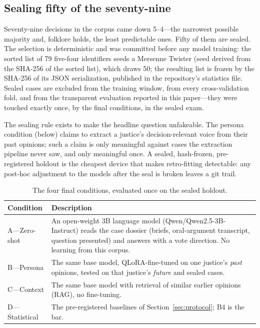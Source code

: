 \subsection{Sealing fifty of the seventy-nine}

Seventy-nine decisions in the corpus came down 5--4---the narrowest
possible majority and, folklore holds, the least predictable ones.
Fifty of them are sealed. The selection is deterministic and was
committed before any model training: the sorted list of 79 five-four
identifiers seeds a Mersenne Twister (seed derived from the SHA-256
of the sorted list), which draws 50; the resulting list is frozen by
the SHA-256 of its JSON serialization, published in the repository's
statistics file. Sealed cases are excluded from the training window,
from every cross-validation fold, and from the transparent evaluation
reported in this paper---they were touched exactly once, by the
final conditions, in the sealed exam.

The sealing rule exists to make the headline question unfakeable.
The persona condition (below) claims to extract a justice's
decision-relevant voice from their past opinions; such a claim is
only meaningful against cases the extraction pipeline never saw, and
only meaningful once. A sealed, hash-frozen, pre-registered holdout
is the cheapest device that makes retro-fitting detectable: any
post-hoc adjustment to the models after the seal is broken leaves a
git trail.

\begin{table}[t]
\centering
\caption{The four final conditions, evaluated once on the sealed
holdout.}
\label{tab:conditions}
\small
\begin{tabularx}{\linewidth}{@{}lX@{}}
\toprule
Condition & Description \\
\midrule
A---Zero-shot & An open-weight 3B language model
(Qwen/Qwen2.5-3B-Instruct) reads the case dossier (briefs,
oral-argument transcript, question presented) and answers with a vote
direction. No learning from this corpus. \\
B---Persona & The same base model, QLoRA-fine-tuned on one
justice's \emph{past} opinions, tested on that justice's
\emph{future} and sealed cases. \\
C---Context & The same base model with retrieval of similar
earlier opinions (RAG), no fine-tuning. \\
D---Statistical & The pre-registered baselines of
Section~\ref{sec:protocol}; B4 is the bar. \\
\bottomrule
\end{tabularx}
\end{table}

